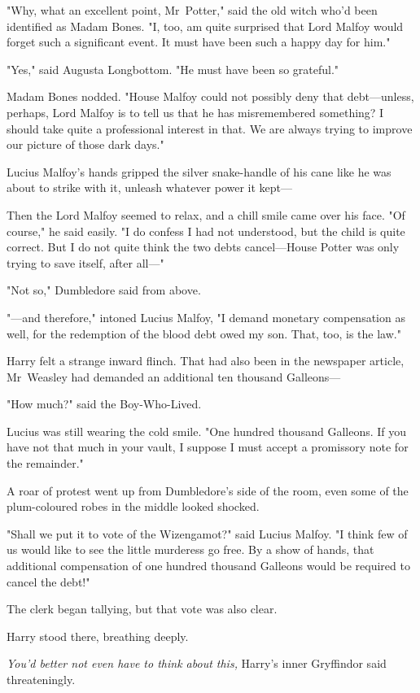 "Why, what an excellent point, Mr~Potter," said the old witch who'd been
identified as Madam Bones. "I, too, am quite surprised that Lord Malfoy would
forget such a significant event. It must have been such a happy day for him."

"Yes," said Augusta Longbottom. "He must have been so grateful."

Madam Bones nodded. "House Malfoy could not possibly deny that debt—unless,
perhaps, Lord Malfoy is to tell us that he has misremembered something? I
should take quite a professional interest in that. We are always trying to
improve our picture of those dark days."

Lucius Malfoy's hands gripped the silver snake-handle of his cane like he was
about to strike with it, unleash whatever power it kept—

Then the Lord Malfoy seemed to relax, and a chill smile came over his face. "Of
course," he said easily. "I do confess I had not understood, but the child is
quite correct. But I do not quite think the two debts cancel—House Potter was
only trying to save itself, after all—"

"Not so," Dumbledore said from above.

"—and therefore," intoned Lucius Malfoy, "I demand monetary compensation as
well, for the redemption of the blood debt owed my son. That, too, is the law."

Harry felt a strange inward flinch. That had also been in the newspaper
article, Mr~Weasley had demanded an additional ten thousand Galleons—

"How much?" said the Boy-Who-Lived.

Lucius was still wearing the cold smile. "One hundred thousand Galleons. If you
have not that much in your vault, I suppose I must accept a promissory note for
the remainder."

A roar of protest went up from Dumbledore's side of the room, even some of the
plum-coloured robes in the middle looked shocked.

"Shall we put it to vote of the Wizengamot?" said Lucius Malfoy. "I think few
of us would like to see the little murderess go free. By a show of hands, that
additional compensation of one hundred thousand Galleons would be required to
cancel the debt!"

The clerk began tallying, but that vote was also clear.

Harry stood there, breathing deeply.

\emph{You'd better not even have to think about this,} Harry's inner Gryffindor
said threateningly.

